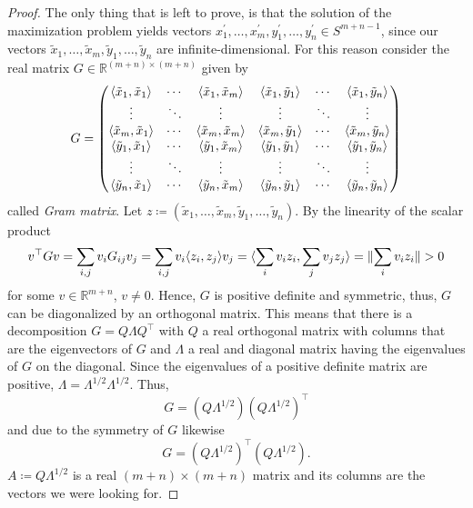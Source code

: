 \begin{proof}
		The only thing that is left to prove, is that the solution of the maximization problem yields vectors $x_1^\prime,\dots,x_m^\prime, y_1^\prime,\dots,y_n^\prime\in S^{m+n-1}$, since our vectors $\tilde{x}_1,\dots,\tilde{x}_m,\tilde{y}_1,\dots,\tilde{y}_n$ are infinite-dimensional. 
		For this reason consider the real matrix $G\in\mathbb{R}^{(m+n)\times(m+n)}$ given by
		\begin{equation}
			G=\begin{pmatrix}
				\langle{\tilde{x}_1},{\tilde{x}_1}\rangle & \cdots & \langle{\tilde{x}_1},{\tilde{x}_m}\rangle& \langle{\tilde{x}_1},{\tilde{y}_1}\rangle & \cdots & \langle{\tilde{x}_1},{\tilde{y}_n}\rangle \\
				 \vdots		& \ddots	& \vdots & \vdots & \ddots & \vdots\\
				 \langle{\tilde{x}_m},{\tilde{x}_1}\rangle & \cdots & \langle{\tilde{x}_m},{\tilde{x}_m}\rangle& \langle{\tilde{x}_m},{\tilde{y}_1}\rangle & \cdots & \langle{\tilde{x}_m},{\tilde{y}_n}\rangle \\
				\langle{\tilde{y}_1},{\tilde{x}_1}\rangle & \cdots & \langle{\tilde{y}_1},{\tilde{x}_m}\rangle& \langle{\tilde{y}_1},{\tilde{y}_1}\rangle & \cdots & \langle{\tilde{y}_1},{\tilde{y}_n}\rangle \\
				 \vdots		& \ddots	& \vdots& \vdots & \ddots & \vdots\\
				 \langle{\tilde{y}_n},{\tilde{x}_1}\rangle & \cdots & \langle{\tilde{y}_n},{\tilde{x}_m}\rangle& \langle{\tilde{y}_n},{\tilde{y}_1}\rangle & \cdots & \langle{\tilde{y}_n},{\tilde{y}_n}\rangle 
			\end{pmatrix}
		\end{equation}
		called \emph{Gram matrix}. Let $z\coloneqq (\tilde{x}_1,\dots,\tilde{x}_m,\tilde{y}_1,\dots,\tilde{y}_n)$. By the linearity of the scalar product
		\begin{align*}
			v^\top G v = \sum_{i,j} v_i G_{ij} v_j 
			= \sum_{i,j} v_i \langle{z_i},{z_j}\rangle v_j 
			= \langle{\sum_i v_i z_i},{\sum_j v_j z_j}\rangle 
			=  \Vert {\sum_i v_i z_i} \Vert > 0
		\end{align*}
		for some $v\in\mathbb{R}^{m+n}$, $v\neq 0$. Hence, $G$ is positive definite and symmetric, thus, $G$ can be diagonalized by an orthogonal matrix. This means that there is a decomposition $G=Q\Lambda Q^\top$ with $Q$ a real orthogonal matrix with columns that are the eigenvectors of $G$ and $\Lambda$ a real and diagonal matrix having the eigenvalues of $G$ on the diagonal. Since the eigenvalues of a positive definite matrix are positive, $\Lambda=\Lambda^{1/2}\Lambda^{1/2}$. Thus,
		\[
			G=(Q\Lambda^{1/2})(Q\Lambda^{1/2})^\top		
		\]
		and due to the symmetry of $G$ likewise
		\[
			G=(Q\Lambda^{1/2})^\top(Q\Lambda^{1/2}).	
		\]
		$A\coloneqq Q\Lambda^{1/2}$ is a real $(m+n)\times (m+n)$ matrix and its columns are the vectors we were looking for.
	\end{proof}
